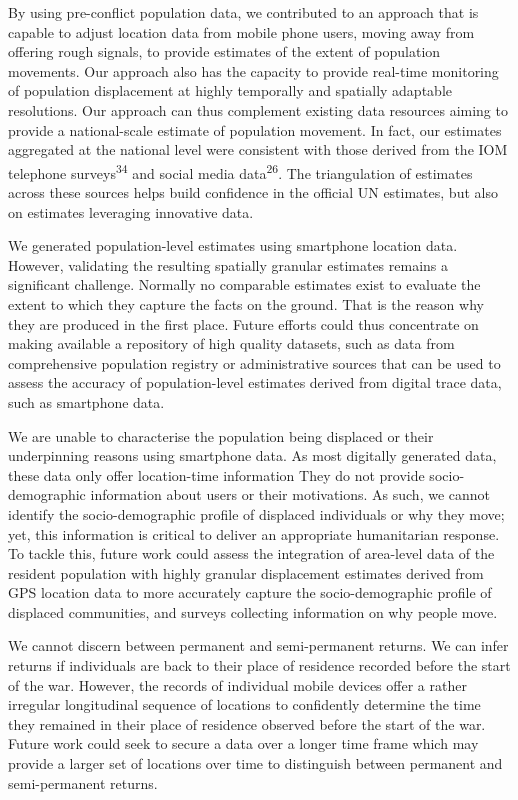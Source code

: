 \documentclass[
  11pt,
]{article}
\begin{document}
By using pre-conflict population data, we contributed to an approach
that is capable to adjust location data from mobile phone users, moving
away from offering rough signals, to provide estimates of the extent of
population movements. Our approach also has the capacity to provide
real-time monitoring of population displacement at highly temporally and
spatially adaptable resolutions. Our approach can thus complement
existing data resources aiming to provide a national-scale estimate of
population movement. In fact, our estimates aggregated at the national
level were consistent with those derived from the IOM telephone
surveys\textsuperscript{34} and social media data\textsuperscript{26}.
The triangulation of estimates across these sources helps build
confidence in the official UN estimates, but also on estimates
leveraging innovative data.

We generated population-level estimates using smartphone location data.
However, validating the resulting spatially granular estimates remains a
significant challenge. Normally no comparable estimates exist to
evaluate the extent to which they capture the facts on the ground. That
is the reason why they are produced in the first place. Future efforts
could thus concentrate on making available a repository of high quality
datasets, such as data from comprehensive population registry or
administrative sources that can be used to assess the accuracy of
population-level estimates derived from digital trace data, such as
smartphone data.

We are unable to characterise the population being displaced or their
underpinning reasons using smartphone data. As most digitally generated
data, these data only offer location-time information They do not
provide socio-demographic information about users or their motivations.
As such, we cannot identify the socio-demographic profile of displaced
individuals or why they move; yet, this information is critical to
deliver an appropriate humanitarian response. To tackle this, future
work could assess the integration of area-level data of the resident
population with highly granular displacement estimates derived from GPS
location data to more accurately capture the socio-demographic profile
of displaced communities, and surveys collecting information on why
people move.

We cannot discern between permanent and semi-permanent returns. We can
infer returns if individuals are back to their place of residence
recorded before the start of the war. However, the records of individual
mobile devices offer a rather irregular longitudinal sequence of
locations to confidently determine the time they remained in their place
of residence observed before the start of the war. Future work could
seek to secure a data over a longer time frame which may provide a
larger set of locations over time to distinguish between permanent and
semi-permanent returns.
\end{document}
